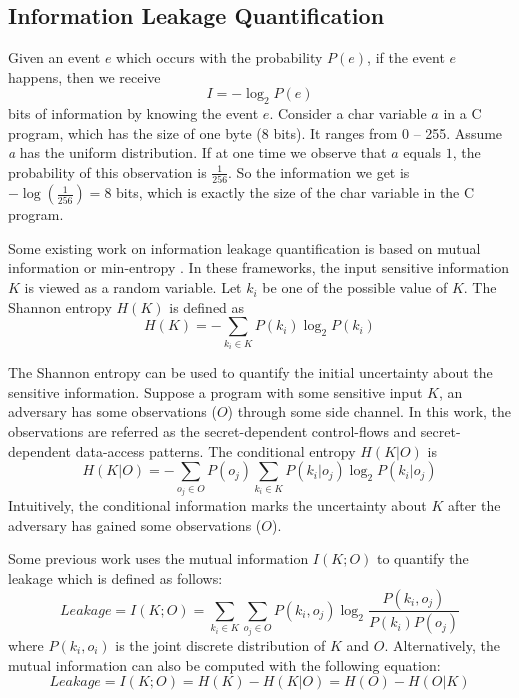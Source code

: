 \subsection{Information Leakage Quantification}


Given an event $e$ which occurs with the probability $P(e)$, if the event $e$ happens, 
then we receive
\begin{displaymath}
    I = - \log_2P(e)
\end{displaymath}
bits of information by knowing the event $e$.
Consider a char variable $a$ in a C program, which has the size
of one byte (8 bits). It ranges from 0 -- 255.  Assume
 \textit{a} has the uniform distribution. If at one time we observe that $a$
equals $1$, the probability of this observation is $\frac{1}{256}$. So the information we get is 
$-\log(\frac{1}{256}) = 8$ bits, which is exactly the size of the char variable in the C program.

Some existing work on information leakage quantification is based on mutual information or 
min-entropy \cite{10.1007/978-3-642-00596-1_21}.
In these frameworks, the input sensitive
information $K$ is viewed as a random variable. Let $k_i$ be one of the possible
value of $K$. The Shannon entropy $H(K)$ is defined as
\begin{displaymath}
    H(K) = - \sum_{k_i {\in} K}P(k_i)\log_2P(k_i)
\end{displaymath}

The Shannon entropy can be used to quantify the initial uncertainty about the sensitive
information. Suppose a program with some
sensitive input $K$, an adversary has some observations ($O$) through some side channel.
In this work, the observations are referred as the secret-dependent control-flows and
secret-dependent data-access patterns.  The conditional entropy $H(K|O)$ is
\begin{displaymath}
    H(K|O) = - \sum_{o_j {\in} O} {P(o_j) \sum_{k_i {\in} K}{P(k_i|o_j)\log_2P(k_i|o_j)}}
\end{displaymath}
Intuitively, the conditional information marks the uncertainty about $K$ after the adversary
has gained some observations ($O$). 

Some previous work uses the mutual information $I(K; O)$ to quantify the leakage which is defined 
as follows:
\begin{displaymath}
    \mathit{Leakage} = I(K;O) = \sum_{k_i {\in} K}{\sum_{o_j {\in} O}{P(k_i, o_j)\log_2\frac{P(k_i, o_j)}{P(k_i)P(o_j)}}}
\end{displaymath}
where $P(k_i, o_i)$ is the joint discrete distribution of $K$ and $O$.
Alternatively, the mutual information can also be computed with the following equation:
\begin{displaymath}
    \mathit{Leakage} = I(K;O) = H(K) - H(K|O) = H(O) - H(O|K)
\end{displaymath}

